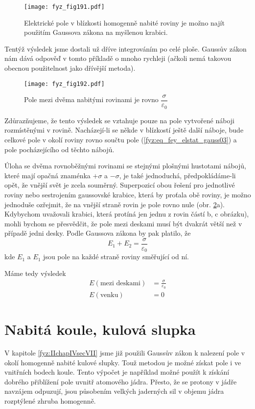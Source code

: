   \begin{figure}[ht!] %
    \centering
    \texttt{[image: fyz\_fig191.pdf]}
    \caption{Elektrické pole v blízkosti homogenně nabité roviny je možno najít použitím   
             Gaussova zákona na myšlenou krabici.}
    \label{fyz:fig191}
  \end{figure}
  
  Tentýž výsledek jsme dostali už dříve integrováním po celé ploše. Gaussův zákon nám dává odpověď v
  tomto příkladě o mnoho rychleji (ačkoli nemá takovou obecnou použitelnost jako dřívější metoda).

  \begin{figure}[ht!]  %
    \centering
    \texttt{[image: fyz\_fig192.pdf]}
    \caption{Pole mezi dvěma nabitými rovinami je rovno \(\dfrac{\sigma}{\varepsilon_0}\)}
    \label{fyz:fig192}
  \end{figure}
  Zdůrazňujeme, že tento výsledek se vztahuje pouze na pole vytvořené náboji rozmístěnými v rovině.
  Nacházejí-li se někde v blízkostí ještě další náboje, bude celkové pole v okolí roviny rovno
  součtu pole (\ref{fyz:eq_fey_elstat_gauss03}) a pole pocházejícího od těchto nábojů.
   
  Úloha se dvěma rovnoběžnými rovinami se stejnými plošnými hustotami nábojů, které mají opačná
  znaménka \(+\sigma\) a \(-\sigma\), je také jednoduchá, předpokládáme-li opět, že vnější svět je
  zcela souměrný. Superpozicí obou řešení pro jednotlivé roviny nebo sestrojením gaussovské krabice,
  která by proťala obě roviny, je možno jednoduše ozřejmit, že na vnější straně rovin je pole rovno
  nule (obr. \ref{fyz:fig192}a). Kdybychom uvažovali krabici, která protíná jen jednu z rovin částí
  b, c obrázku), mohli bychom se přesvědčit, že pole mezi deskami musí být dvakrát větší než v
  případě jedni desky. Podle Gaussova zákona by pak platilo, že
  \begin{equation}\label{fyz:eq_fey_elstat_gauss04}
    E_1 + E_2 = \frac{\sigma}{\varepsilon_0}
  \end{equation}
  kde \(E_1\) a \(E_1\) jsou pole na každé straně roviny směřující od ní.

  Máme tedy výsledek
  \begin{align}
    E (\text{mezi deskami}) &= \frac{\sigma}{\varepsilon_0} \\
    E (\text{venku})        &= 0  
  \end{align}
  
\section{Nabitá koule, kulová slupka}\label{fyz:IIchapVsecVI}
  V kapitole \ref{fyz:IIchapIVsecVII} jsme již použili Gaussův zákon k nalezení pole v okolí
  homogenně nabité kulové slupky. Touž metodou je možné získat pole i ve vnitřních bodech koule.
  Tento výpočet je například možné použít k získání dobrého přiblížení pole uvnitř atomového jádra.
  Přesto, že se protony v jádře navzájem odpuzují, jsou působením velkých jaderných sil v objemu
  jádra rozptýlené zhruba homogenně.


